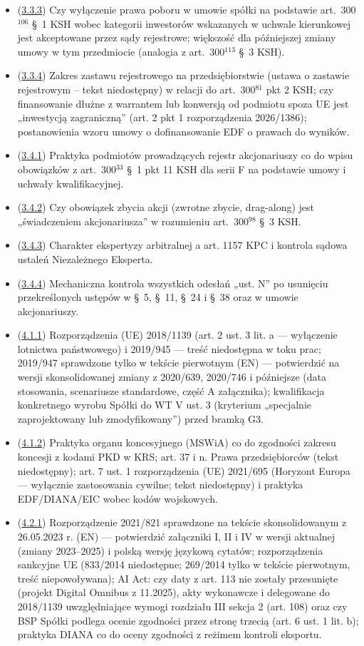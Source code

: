 \documentclass[12pt,a4paper]{report}
\begin{document}
\begin{itemize}
  \item (\hyperref[memo:3.3.3]{3.3.3}) Czy wyłączenie prawa poboru w umowie spółki na podstawie art.~300$^{106}$ §~1 KSH wobec kategorii inwestorów wskazanych w uchwale kierunkowej jest akceptowane przez sądy rejestrowe; większość dla późniejszej zmiany umowy w tym przedmiocie (analogia z art.~300$^{113}$ §~3 KSH).
  \item (\hyperref[memo:3.3.4]{3.3.4}) Zakres zastawu rejestrowego na przedsiębiorstwie (ustawa o zastawie rejestrowym – tekst niedostępny) w relacji do art.~300$^{81}$ pkt 2 KSH; czy finansowanie dłużne z warrantem lub konwersją od podmiotu spoza UE jest „inwestycją zagraniczną” (art. 2 pkt 1 rozporządzenia 2026/1386); postanowienia wzoru umowy o dofinansowanie EDF o prawach do wyników.
  \item (\hyperref[memo:3.4.1]{3.4.1}) Praktyka podmiotów prowadzących rejestr akcjonariuszy co do wpisu obowiązków z art.~300$^{33}$ §~1 pkt 11 KSH dla serii F na podstawie umowy i uchwały kwalifikacyjnej.
  \item (\hyperref[memo:3.4.2]{3.4.2}) Czy obowiązek zbycia akcji (zwrotne zbycie, drag-along) jest „świadczeniem akcjonariusza” w rozumieniu art.~300$^{98}$ §~3 KSH.
  \item (\hyperref[memo:3.4.3]{3.4.3}) Charakter ekspertyzy arbitralnej a art. 1157 KPC i kontrola sądowa ustaleń Niezależnego Eksperta.
  \item (\hyperref[memo:3.4.4]{3.4.4}) Mechaniczna kontrola wszystkich odesłań „ust. N” po usunięciu przekreślonych ustępów w §~5, §~11, §~24 i §~38 oraz w umowie akcjonariuszy.
  \item (\hyperref[memo:4.1.1]{4.1.1}) Rozporządzenia (UE) 2018/1139 (art. 2 ust. 3 lit. a --- wyłączenie lotnictwa państwowego) i 2019/945 --- treść niedostępna w toku prac; 2019/947 sprawdzone tylko w tekście pierwotnym (EN) --- potwierdzić na wersji skonsolidowanej zmiany z 2020/639, 2020/746 i późniejsze (data stosowania, scenariusze standardowe, część A załącznika); kwalifikacja konkretnego wyrobu Spółki do WT V ust. 3 (kryterium „specjalnie zaprojektowany lub zmodyfikowany”) przed bramką G3.
  \item (\hyperref[memo:4.1.2]{4.1.2}) Praktyka organu koncesyjnego (MSWiA) co do zgodności zakresu koncesji z kodami PKD w KRS; art. 37 i n. Prawa przedsiębiorców (tekst niedostępny); art. 7 ust. 1 rozporządzenia (UE) 2021/695 (Horyzont Europa --- wyłącznie zastosowania cywilne; tekst niedostępny) i praktyka EDF/DIANA/EIC wobec kodów wojskowych.
  \item (\hyperref[memo:4.2.1]{4.2.1}) Rozporządzenie 2021/821 sprawdzone na tekście skonsolidowanym z 26.05.2023 r. (EN) --- potwierdzić załączniki I, II i IV w wersji aktualnej (zmiany 2023--2025) i polską wersję językową cytatów; rozporządzenia sankcyjne UE (833/2014 niedostępne; 269/2014 tylko w tekście pierwotnym, treść niepowoływana); AI Act: czy daty z art. 113 nie zostały przesunięte (projekt Digital Omnibus z 11.2025), akty wykonawcze i delegowane do 2018/1139 uwzględniające wymogi rozdziału III sekcja 2 (art. 108) oraz czy BSP Spółki podlega ocenie zgodności przez stronę trzecią (art. 6 ust. 1 lit. b); praktyka DIANA co do oceny zgodności z reżimem kontroli eksportu.

\end{itemize}
\end{document}
